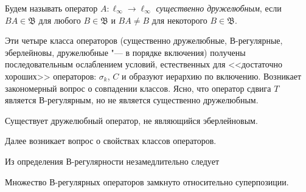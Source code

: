 \begin{definition}
	Будем называть оператор $A:\ell_\infty \to \ell_\infty$ \emph{существенно дружелюбным}, если $BA\in\mathfrak B$ для любого $B\in\mathfrak B$ и $BA\ne B$ для некоторого $B\in\mathfrak B$.
\end{definition}

Эти четыре класса операторов (существенно дружелюбные, В-регулярные, эберлейновы, дружелюбные "--- в порядке включения)
получены последовательным ослаблением условий, естественных для <<достаточно хороших>> операторов:
$\sigma_k$, $C$
и образуют иерархию по включению.
Возникает закономерный вопрос о совпадении классов.
Ясно, что оператор сдвига $T$ является В-регулярным, но не является существенно дружелюбным.

\begin{hypothesis}
	Существует дружелюбный оператор, не являющийся эберлейновым.
\end{hypothesis}


Далее возникает вопрос о свойствах классов операторов.

Из определения В-регулярности незамедлительно следует

\begin{lemma}
	Множество В-регулярных операторов замкнуто относительно суперпозиции.
\end{lemma}
